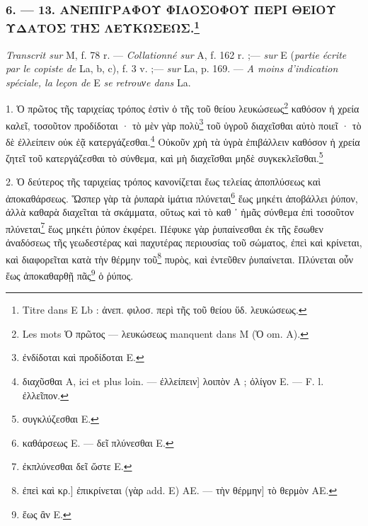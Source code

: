 \documentclass[a4paper, 11pt, oneside, polutonikogreek, french]{article}
\begin{document}
\bigskip
\centerline{\EightStarTaper}
\centerline{\EightStarTaper\EightStarTaper}
\bigskip

\subsubsection[6. --- 13. ΑΝΕΠΙΓΡΑΦΟΥ ΦΙΛΟΣΟΦΟΥ ΠΕΡΙ ΘΕΙΟΥ ΥΔΑΤΟΣ ΤΗΣ ΛΕΥΚΩΣΕΩΣ.]{6. --- 13. ΑΝΕΠΙΓΡΑΦΟΥ ΦΙΛΟΣΟΦΟΥ ΠΕΡΙ ΘΕΙΟΥ ΥΔΑΤΟΣ ΤΗΣ ΛΕΥΚΩΣΕΩΣ.\footnote{Titre dans E Lb : ἀνεπ. φιλοσ. περὶ τῆς τοῦ θείου ὕδ. λευκώσεως.}}

\emph{Transcrit sur} M, f. 78 r. --- \emph{Collationné sur} A, f. 162 r. ;--- \emph{sur} E (\emph{partie écrite par le copiste de} La, b, c), f. 3 v. ;--- \emph{sur} La, p. 169. --- \emph{A moins d'indication spéciale, la leçon de} E \emph{se retrouνe dans} La.

\bigskip

1. Ὁ πρῶτος τῆς ταριχείας τρόπος ἐστὶν ὁ τῆς τοῦ θείου λευκώσεως\footnote{Les mots Ὁ πρῶτος --- λευκώσεως manquent dans M (Ὁ om. A).} καθόσον ἡ χρεία καλεῖ, τοσοῦτον προδίδοται · τὸ μὲν γὰρ πολὺ\footnote{ἐνδίδοται καὶ προδίδοται E.} τοῦ ὑγροῦ διαχεῖσθαι αὐτὸ ποιεῖ · τὸ δὲ ἐλλείπειν οὐκ ἐᾷ κατεργάζεσθαι.\footnote{διαχῦσθαι A, ici et plus loin. --- ἐλλείπειν] λοιπὸν A ; ὀλίγον E. --- F. l. ἐλλεῖπον.} Οὐκοῦν χρὴ τὰ ὑγρὰ ἐπιβάλλειν καθόσον ἡ χρεία ζητεῖ τοῦ κατεργάζεσθαι τὸ σύνθεμα, καὶ μὴ διαχεῖσθαι μηδὲ συγκεκλεῖσθαι.\footnote{συγκλύζεσθαι E.}

2. Ὁ δεύτερος τῆς ταριχείας τρόπος κανονίζεται ἕως τελείας ἀποπλύσεως καὶ ἀποκαθάρσεως. Ὥσπερ γὰρ τὰ ῥυπαρὰ ἱμάτια πλύνεται\footnote{καθάρσεως E. --- δεῖ πλύνεσθαι E.} ἕως μηκέτι ἀποβάλλει ῥύπον, ἀλλὰ καθαρὰ διαχεῖται τὰ σκάμματα, οὕτως καὶ τὸ καθ ᾽ ἡμᾶς σύνθεμα ἐπὶ τοσοῦτον πλύνεται\footnote{ἐκπλύνεσθαι δεῖ ὥστε E.} ἕως μηκέτι ῥύπον ἐκφέρει. Πέφυκε γὰρ ῥυπαίνεσθαι ἐκ τῆς ἔσωθεν ἀναδόσεως τῆς γεωδεστέρας καὶ παχυτέρας περιουσίας τοῦ σώματος, ἐπεὶ καὶ κρίνεται, καὶ διαφορεῖται κατὰ τὴν θέρμην τοῦ\footnote{ἐπεὶ καὶ κρ.] ἐπικρίνεται (γὰρ add. E) AE. --- τὴν θέρμην] τὸ θερμὸν AE.} πυρὸς, καὶ ἐντεῦθεν ῥυπαίνεται. Πλύνεται οὖν ἕως ἀποκαθαρθῇ πᾶς\footnote{ἕως ἂν E.} ὁ ῥύπος.
\end{document}
